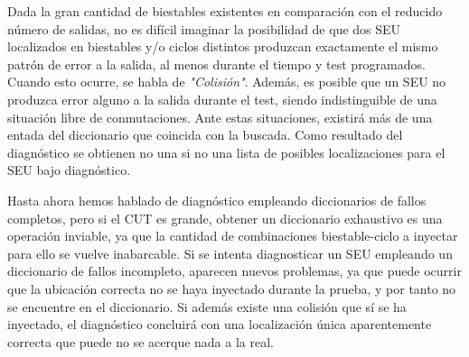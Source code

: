 Dada la gran cantidad de biestables existentes en comparación con el reducido
número de salidas, no es difícil imaginar la posibilidad de que dos \gls{SEU}
localizados en biestables y/o ciclos distintos produzcan exactamente el mismo
patrón de error a la salida, al menos durante el tiempo y test programados. 
Cuando esto ocurre, se habla de \textit{"Colisión"}. Además, es posible que un
\gls{SEU} no produzca error alguno a la salida durante el test, siendo
indistinguible de una situación libre de conmutaciones. Ante estas situaciones,
existirá más de una entada del diccionario que coincida con la buscada. Como
resultado del diagnóstico se obtienen no una si no una lista de posibles
localizaciones para el \gls{SEU} bajo diagnóstico.

Hasta ahora hemos hablado de diagnóstico empleando diccionarios de fallos
completos, pero si el \gls{CUT} es grande, obtener un diccionario exhaustivo es
una operación inviable, ya que la cantidad de combinaciones biestable-ciclo a
inyectar para ello se vuelve inabarcable. Si se intenta diagnosticar un \gls{SEU}
empleando un diccionario de fallos incompleto, aparecen nuevos problemas, ya que
puede ocurrir que la ubicación correcta no se haya inyectado durante la prueba, y
por tanto no se encuentre en el diccionario. Si además existe una colisión que sí
se ha inyectado, el diagnóstico concluirá con una localización única
aparentemente correcta que puede no se acerque nada a la real.


\endinput
